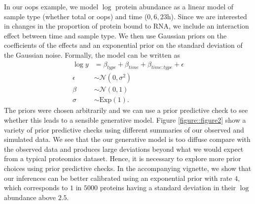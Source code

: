 \documentclass[12pt,english, journal=jpr, layout=twocolumn]{article}
\begin{document}
In our oops example, we model $\log$ protein abundance as a linear model of sample type (whether total or oops) and time ($0,6,23$h). Since we are interested in changes in the proportion of protein bound to RNA, we include an interaction effect between time and sample type. We then use Gaussian priors on the coefficients of the effects and an exponential prior on the standard deviation of the Gaussian noise. Formally, the model can be written as
\begin{equation}
\begin{split}
\log y &= \beta_{type} + \beta_{time} + \beta_{time:type} + \epsilon\\
\epsilon &\sim \mathcal{N}(0, \sigma^2)\\
\beta &\sim \mathcal{N}(0, 1)\\
\sigma &\sim \text{Exp}(1).
\end{split}
\end{equation}
The priors were chosen arbitrarily and we can use a prior predictive check to see whether this leads to a sensible generative model. Figure \ref{figure::figure2} show a variety of prior predictive checks using different summaries of our observed and simulated data. We see that the our generative model is too diffuse compare with the observed data and produces large deviations beyond what we would expect from a typical proteomics dataset. Hence, it is necessary to explore more prior choices using prior predictive checks. In the accompanying vignette, we show that our inferences can be better calibrated using an exponential prior with rate $4$, which corresponds to $1$ in $5000$ proteins having a standard deviation in their $\log$ abundance above $2.5$.
\end{document}
